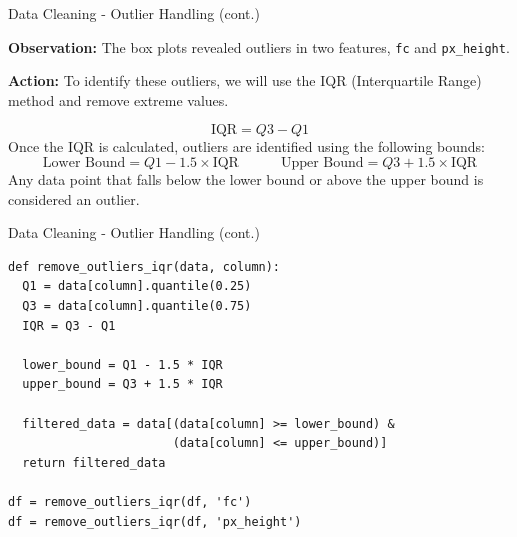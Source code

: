 \documentclass[14pt, aspectratio=169]{beamer}
\begin{document}
\begin{frame}{Data Cleaning - Outlier Handling (cont.)}
  \begin{minipage}{0.8\textwidth}
    \begin{block}{}
      \textbf{Observation:} \small
      The box plots revealed outliers in two features, \texttt{fc} and \texttt{px\_height}.
    \end{block}
  \end{minipage}
  \begin{minipage}{0.8\textwidth}
    \begin{block}{}
      \textbf{Action:} \small
      To identify these outliers, we will use the IQR (Interquartile Range) method and remove extreme values.
    \end{block}
  \end{minipage}
  \footnotesize
  \[
  \text{IQR} = Q3 - Q1
  \]
  Once the IQR is calculated, outliers are identified using the following bounds:
  \[
  \text{Lower Bound} = Q1 - 1.5 \times \text{IQR} \quad \quad \quad \text{Upper Bound} = Q3 + 1.5 \times \text{IQR}
  \]
  Any data point that falls below the lower bound or above the upper bound is considered an outlier.
  \normalsize
\end{frame}

\begin{frame}[containsverbatim]{Data Cleaning - Outlier Handling (cont.)}
\footnotesize
\begin{verbatim}
def remove_outliers_iqr(data, column):
  Q1 = data[column].quantile(0.25)
  Q3 = data[column].quantile(0.75)
  IQR = Q3 - Q1

  lower_bound = Q1 - 1.5 * IQR
  upper_bound = Q3 + 1.5 * IQR

  filtered_data = data[(data[column] >= lower_bound) &
                       (data[column] <= upper_bound)]
  return filtered_data

df = remove_outliers_iqr(df, 'fc')
df = remove_outliers_iqr(df, 'px_height')
\end{verbatim}

\end{frame}
\end{document}

